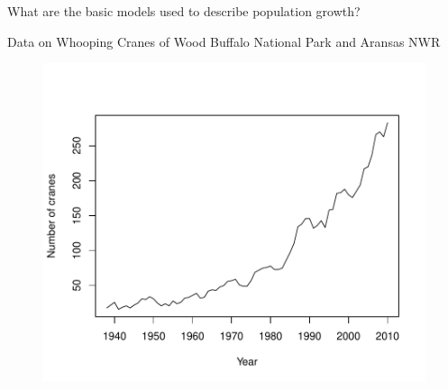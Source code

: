 \begin{frame}
    \begin{adjustwidth}{-2em}{-1.5em}
        \vspace{-1mm}
        What are the basic models used to describe population growth?

        \vspace{2mm}
        Data on Whooping Cranes of Wood Buffalo National Park and Aransas NWR

        \vspace{-1.1cm}
        \begin{figure}
        \begin{center}
            \includegraphics[width=0.75\linewidth]{crane-growth.pdf}
        \end{center}
        \end{figure}

        \vspace{-8mm}
    \end{adjustwidth}
\end{frame}

